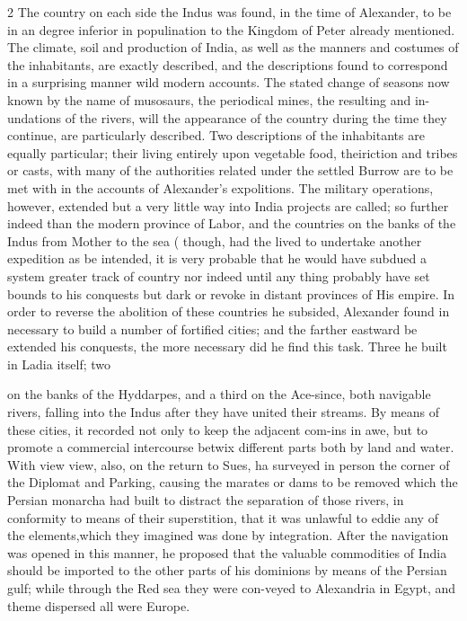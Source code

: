 \documentclass[10pt]{article}
\begin{document}
\begin{multicols}{2}
The country on each side the Indus was found, in the time of Alexander, to be in an degree inferior in populination to the Kingdom of Peter already mentioned. The climate, soil and production of India, as well as the manners and costumes of the inhabitants, are exactly described, and the descriptions found to correspond in a surprising manner wild modern accounts. The stated change of seasons now known by the name of musosaurs, the periodical mines, the resulting and in-undations of the rivers, will the appearance of the country during the time they continue, are particularly described. Two descriptions of the inhabitants are equally particular; their living entirely upon vegetable food, theiriction and tribes or casts, with many of the authorities related under the settled Burrow are to be met with in the accounts of Alexander’s expolitions. The military operations, however, extended but a very little way into India projects are called; so further indeed than the modern province of Labor, and the countries on the banks of the Indus from Mother to the sea ( though, had the lived to undertake another expedition as be intended, it is very probable that he would have subdued a system greater track of country nor indeed until any thing probably have set bounds to his conquests but dark or revoke in distant provinces of His empire. In order to reverse the abolition of these countries he subsided, Alexander found in necessary to build a number of fortified cities; and the farther eastward be extended his conquests, the more necessary did he find this task. Three he built in Ladia itself; two

on the banks of the Hyddarpes, and a third on the Ace-since, both navigable rivers, falling into the Indus after they have united their streams. By means of these cities, it recorded not only to keep the adjacent com-ins in awe, but to promote a commercial intercourse betwix different parts both by land and water. With view view, also, on the return to Sues, ha surveyed in person the corner of the Diplomat and Parking, causing the marates or dams to be removed which the Persian monarcha had built to distract the separation of those rivers, in conformity to means of their superstition, that it was unlawful to eddie any of the elements,which they imagined was done by integration. After the navigation was opened in this manner, he proposed that the valuable commodities of India should be imported to the other parts of his dominions by means of the Persian gulf; while through the Red sea they were con-veyed to Alexandria in Egypt, and theme dispersed all were Europe.


\end{multicols}
\end{document}
